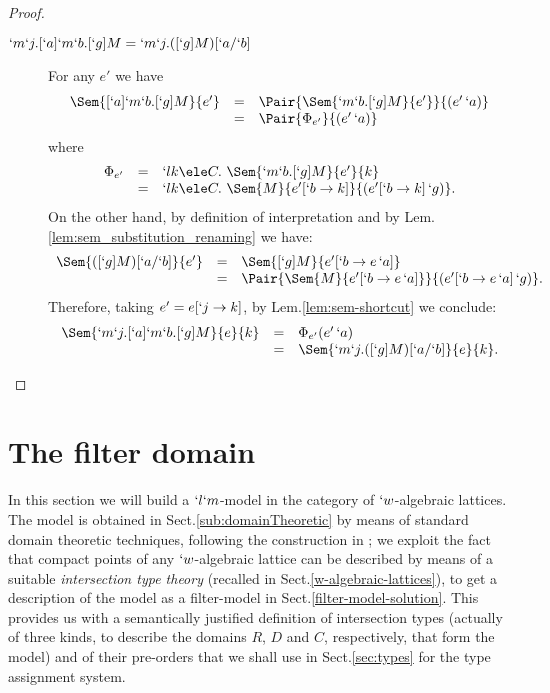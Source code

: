 \documentclass{lmcs}
\begin{document}
\begin{proof}
\begin{description}
\item [{$`m`j.[`a]`m`b.[`g]M = `m`j. ([`g]M)[`a/`b] $}]
For any $e'$ %
we have 
 \[ \begin{array}{rcl}
\Sem{[`a]`m`b.[`g]M}{e'} 
	&=& \Pair{\Sem{`m`b.[`g]M}{e'}}{(e'\, `a)} \\ 
	&=& \Pair{\Phi_{e'}}{(e'\, `a)} \end{array} \]
where
 \[ \begin{array}{rcl}
\Phi_{e'} 
	&=& `l k \ele C.~\Sem{`m`b.[`g]M}{e'}{k} \\ 
	&=& `l k \ele C.~\Sem{M}{e'[`b \to k]}{(e'[`b \to k]\, `g)}. 
 \end{array} \]
On the other hand, by definition of interpretation and by Lem.\skp\ref{lem:sem_substitution_renaming} we have:
 \[ \begin{array}{rcl}
\Sem{([`g]M)[`a/`b]}{e'} 
	&=& \Sem{[`g]M}{e'[`b \to e\,`a]} \\
	&=& \Pair{\Sem{M}{e'[`b \to e\,`a]}}{(e'[`b \to e\,`a]\,`g)}.
 \end{array} \]
Therefore, taking $e' = e[`j \to k]$, by Lem.\skp\ref{lem:sem-shortcut} we conclude:
 \[ \begin{array}{rcl}
\Sem{`m`j.[`a]`m`b.[`g]M}{ e }{ k } 
	&=& \Phi_{e'}(e'\,`a) \\
	&=& \Sem{`m`j. ([`g]M)[`a/`b]}{e}{k}.
 \end{array} \]
 \arrayqed[-22pt]

 \end{description}
 \end{proof}


 \section{The filter domain} \label{sec:filter}

 In this section we will build a $`l`m$-model in the category of $`w$-algebraic lattices. 
The model is obtained in Sect.\skp\ref{sub:domainTheoretic} by means of standard domain theoretic techniques, following the construction in \cite{Streicher-Reus'98}; we exploit the fact that compact points of any $`w$-algebraic lattice can be described by means of a suitable \emph{intersection type theory} (recalled in Sect.\skp\ref{w-algebraic-lattices}), to get a description of the model as a filter-model in Sect.\skp\ref{filter-model-solution}. 
This provides us with a semantically justified definition of intersection types (actually of three kinds, to describe the domains $R$, $D$ and $C$, respectively, that form the model) and of their pre-orders that we shall use in Sect.\skp\ref{sec:types} for the type assignment system.
\end{document}

